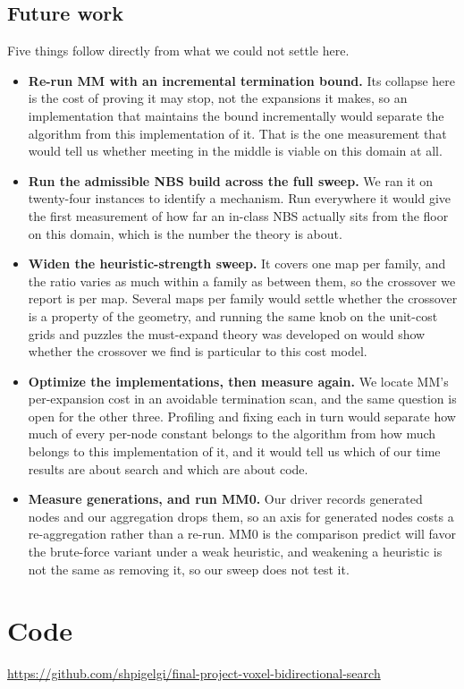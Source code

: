 \documentclass[letterpaper]{article} %
\begin{document}
\subsection{Future work}
Five things follow directly from what we could not settle here.
\begin{itemize}
  \item \textbf{Re-run MM with an incremental termination bound.} Its collapse here is the cost of proving it may stop, not the expansions it makes, so an implementation that maintains the bound incrementally would separate the algorithm from this implementation of it. That is the one measurement that would tell us whether meeting in the middle is viable on this domain at all.
  \item \textbf{Run the admissible NBS build across the full sweep.} We ran it on twenty-four instances to identify a mechanism. Run everywhere it would give the first measurement of how far an in-class NBS actually sits from the floor on this domain, which is the number the theory is about.
  \item \textbf{Widen the heuristic-strength sweep.} It covers one map per family, and the ratio varies as much within a family as between them, so the crossover we report is per map. Several maps per family would settle whether the crossover is a property of the geometry, and running the same knob on the unit-cost grids and puzzles the must-expand theory was developed on would show whether the crossover we find is particular to this cost model.
  \item \textbf{Optimize the implementations, then measure again.} We locate MM's per-expansion cost in an avoidable termination scan, and the same question is open for the other three. Profiling and fixing each in turn would separate how much of every per-node constant belongs to the algorithm from how much belongs to this implementation of it, and it would tell us which of our time results are about search and which are about code.

\item \textbf{Measure generations, and run MM0.} Our driver records generated nodes and our aggregation drops them, so an axis for generated nodes costs a re-aggregation rather than a re-run. MM0 is the comparison \citet{holte2017mm} predict will favor the brute-force variant under a weak heuristic, and weakening a heuristic is not the same as removing it, so our sweep does not test it.
\end{itemize}

\section{Code}
\begingroup\raggedright\sloppy \url{https://github.com/shpigelgi/final-project-voxel-bidirectional-search}\par
\endgroup
\end{document}
